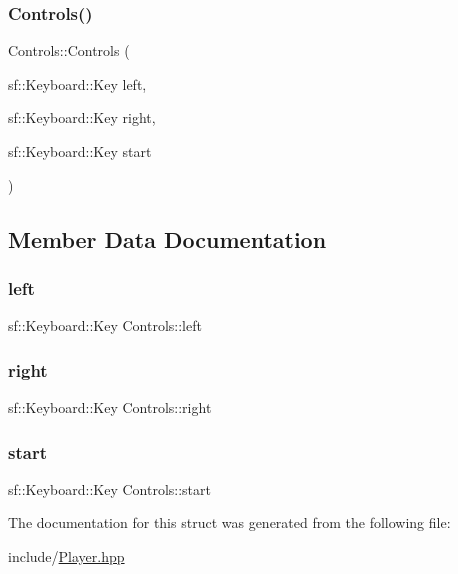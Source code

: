 \subsubsection{\texorpdfstring{Controls()}{Controls()}}
{\footnotesize\ttfamily Controls\+::\+Controls (\begin{DoxyParamCaption}\item[{sf\+::\+Keyboard\+::\+Key}]{left,  }\item[{sf\+::\+Keyboard\+::\+Key}]{right,  }\item[{sf\+::\+Keyboard\+::\+Key}]{start }\end{DoxyParamCaption})\hspace{0.3cm}{\ttfamily [inline]}}



\subsection{Member Data Documentation}
\mbox{\label{struct_controls_a67ae975a4254a72c796681a7c8c850da}} 
\subsubsection{\texorpdfstring{left}{left}}
{\footnotesize\ttfamily sf\+::\+Keyboard\+::\+Key Controls\+::left}

\mbox{\label{struct_controls_ac0b4b73fa43e078cc66a4e531cdc9623}} 
\subsubsection{\texorpdfstring{right}{right}}
{\footnotesize\ttfamily sf\+::\+Keyboard\+::\+Key Controls\+::right}

\mbox{\label{struct_controls_a83bddc1c685070d19f0b509f3bf301f0}} 
\subsubsection{\texorpdfstring{start}{start}}
{\footnotesize\ttfamily sf\+::\+Keyboard\+::\+Key Controls\+::start}



The documentation for this struct was generated from the following file\+:\begin{DoxyCompactItemize}
\item 
include/\mbox{\hyperlink{_player_8hpp}{Player.\+hpp}}\end{DoxyCompactItemize}
